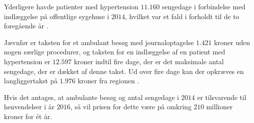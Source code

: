 \noindent
Yderligere havde patienter med hypertension $11.160$ sengedage i forbindelse med indlæggelse på offentlige sygehuse i $2014$, hvilket var et fald i forholdt til de to foregående år \citep{sundhedsdatastyrelsen2016}. 

Jævnfør \citeauthor{takstvejledning2016} er taksten for et ambulant besøg  med journaloptagelse $1.421$ kroner uden nogen særlige procedurer, og taksten for en indlæggelse af en patient med hypertension er $12.597$ kroner indtil fire dage, der er det maksimale antal sengedage, der er dækket af denne takst. Ud over fire dage kan der opkræves en langliggertakst på $1.976$ kroner fra regionen \citep{takstvejledning2016}. 

Hvis det antages, at ambulante besøg og antal sengedage i $2014$ er tilsvarende til henvendelser i år $2016$, så vil prisen for dette være på omkring $210$ millioner kroner for ét år. 